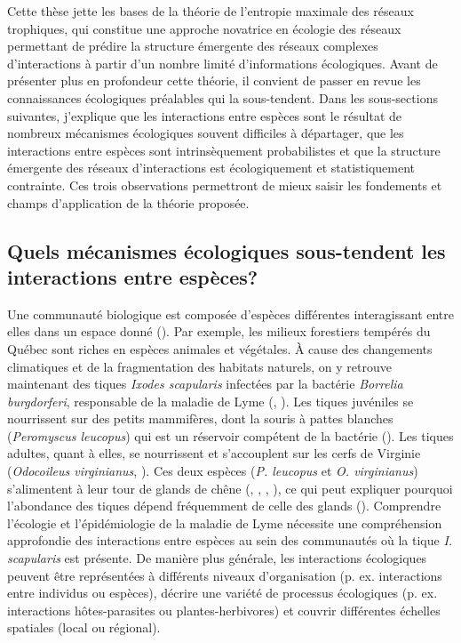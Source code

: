 Cette thèse jette les bases de la théorie de l'entropie maximale des réseaux
trophiques, qui constitue une approche novatrice en écologie des réseaux
permettant de prédire la structure émergente des réseaux complexes
d'interactions à partir d'un nombre limité d'informations écologiques. Avant de
présenter plus en profondeur cette théorie, il convient de passer en revue les
connaissances écologiques préalables qui la sous-tendent. Dans les sous-sections
suivantes, j'explique que les interactions entre espèces sont le résultat de
nombreux mécanismes écologiques souvent difficiles à départager, que les
interactions entre espèces sont intrinsèquement probabilistes et que la
structure émergente des réseaux d'interactions est écologiquement et
statistiquement contrainte. Ces trois observations permettront de mieux saisir
les fondements et champs d'application de la théorie proposée.

\subsection{Quels mécanismes écologiques sous-tendent les interactions entre espèces?} 

Une communauté biologique est composée d'espèces différentes interagissant entre
elles dans un espace donné (\cite{Stroud2015Community}). Par exemple, les
milieux forestiers tempérés du Québec sont riches en espèces animales et
végétales. À cause des changements climatiques et de la fragmentation des
habitats naturels, on y retrouve maintenant des tiques \textit{Ixodes
scapularis} infectées par la bactérie \textit{Borrelia burgdorferi}, responsable
de la maladie de Lyme (\cite{Ogden2009Emergence}, \cite{Simon2014Climate}). Les
tiques juvéniles se nourrissent sur des petits mammifères, dont la souris à
pattes blanches (\textit{Peromyscus leucopus}) qui est un réservoir compétent de
la bactérie (\cite{Donahue1987Reservoir}). Les tiques adultes, quant à elles, se
nourrissent et s'accouplent sur les cerfs de Virginie (\textit{Odocoileus
virginianus}, \cite{Lane1991Lyme}). Ces deux espèces (\textit{P. leucopus} et
\textit{O. virginianus}) s'alimentent à leur tour de glands de chêne
(\cite{McShea1993Variablea}, \cite{Elkinton1996Interactions},
\cite{Wolff1996Population}, \cite{McShea2000Influence}), ce qui peut expliquer
pourquoi l'abondance des tiques dépend fréquemment de celle des glands
(\cite{Ostfeld2006Climate}). Comprendre l'écologie et l'épidémiologie de la
maladie de Lyme nécessite une compréhension approfondie des interactions entre
espèces au sein des communautés où la tique \textit{I. scapularis} est présente.
De manière plus générale, les interactions écologiques peuvent être représentées
à différents niveaux d'organisation (p. ex. interactions entre individus ou
espèces), décrire une variété de processus écologiques (p. ex. interactions
hôtes-parasites ou plantes-herbivores) et couvrir différentes échelles spatiales
(local ou régional).


